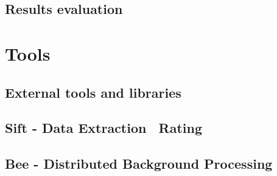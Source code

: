\subsection{Results evaluation} %
\label{sub:results_evaluation}



\section{Tools} %
\label{sec:tools}

\subsection{External tools and libraries} %
\label{sub:external_tools_and_libraries}


\subsection{Sift - Data Extraction \amper\ Rating} %
\label{sub:sift_data_extraction_and_rating}


\subsection{Bee - Distributed Background Processing} %
\label{sub:bee_distributed_background_processing}



